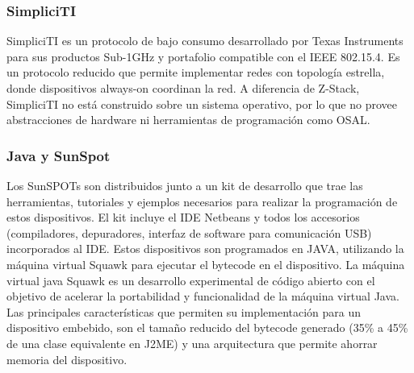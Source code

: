 \subsubsection{SimpliciTI}
SimpliciTI es un protocolo de bajo consumo desarrollado por Texas Instruments 	para sus productos Sub-1GHz y portafolio compatible con el IEEE 802.15.4. Es un protocolo reducido que permite implementar redes con topología estrella, donde dispositivos always-on  coordinan la red. A diferencia de Z-Stack, SimpliciTI no está construido sobre un sistema operativo, por lo que no provee abstracciones de hardware ni herramientas de programación como OSAL.	

\subsubsection{Java y SunSpot}
Los SunSPOTs son distribuidos junto a un kit de desarrollo que trae las herramientas, tutoriales y ejemplos necesarios para realizar la programación de estos dispositivos. El kit incluye el IDE Netbeans y todos los accesorios (compiladores, depuradores, interfaz de software para comunicación USB) incorporados al IDE. Estos dispositivos son programados en JAVA, utilizando la máquina virtual Squawk para ejecutar el bytecode en el dispositivo. La máquina virtual java Squawk es un desarrollo experimental de código abierto con el objetivo de acelerar la portabilidad y funcionalidad de la máquina virtual Java. Las principales características que permiten su implementación para un dispositivo embebido, son el tamaño reducido del bytecode generado (35\%  a 45\% de una clase equivalente en J2ME)  y una arquitectura que permite ahorrar memoria del dispositivo.




